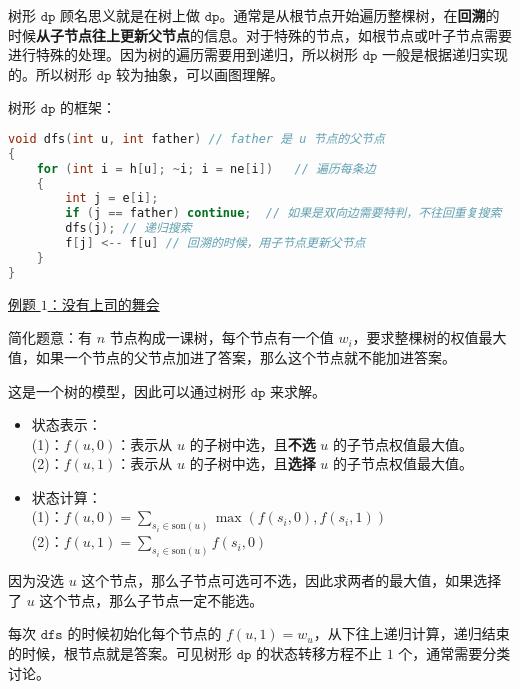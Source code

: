 


树形 $\texttt{dp}$ 顾名思义就是在树上做 $\texttt{dp}$。通常是从根节点开始遍历整棵树，在\textbf{回溯}的时候\textbf{从子节点往上更新父节点}的信息。对于特殊的节点，如根节点或叶子节点需要进行特殊的处理。因为树的遍历需要用到递归，所以树形 $\texttt{dp}$ 一般是根据递归实现的。所以树形 $\texttt{dp}$ 较为抽象，可以画图理解。

树形 $\texttt{dp}$ 的框架：

\begin{lstlisting}[language=cpp]
void dfs(int u, int father) // father 是 u 节点的父节点
{
    for (int i = h[u]; ~i; i = ne[i])   // 遍历每条边
    {
        int j = e[i];
        if (j == father) continue;  // 如果是双向边需要特判，不往回重复搜索
        dfs(j); // 递归搜索
        f[j] <-- f[u] // 回溯的时候，用子节点更新父节点
    }
}
\end{lstlisting}

\href{https://www.luogu.com.cn/problem/P1352}{例题 $1$：没有上司的舞会}

简化题意：有 $n$ 节点构成一课树，每个节点有一个值 $w_i$，要求整棵树的权值最大值，如果一个节点的父节点加进了答案，那么这个节点就不能加进答案。

这是一个树的模型，因此可以通过树形 $\texttt{dp}$ 来求解。

\begin{itemize}
\item 状态表示：\\
    (1)：$f(u, 0)$：表示从 $u$ 的子树中选，且\textbf{不选} $u$ 的子节点权值最大值。\\
    (2)：$f(u, 1)$：表示从 $u$ 的子树中选，且\textbf{选择} $u$ 的子节点权值最大值。

\end{itemize}

\begin{itemize}
\item 状态计算：\\
    (1)：$f(u, 0) = \sum_{s_i \in \text{son}(u)} \max(f(s_i, 0), f(s_i, 1))$ \\
    (2)：$f(u, 1) = \sum_{s_i \in \text{son}(u)} f(s_i, 0)$
\end{itemize}

因为没选 $u$ 这个节点，那么子节点可选可不选，因此求两者的最大值，如果选择了 $u$ 这个节点，那么子节点一定不能选。

每次 $\texttt{dfs}$ 的时候初始化每个节点的 $f(u, 1) = w_u$，从下往上递归计算，递归结束的时候，根节点就是答案。可见树形 $\texttt{dp}$ 的状态转移方程不止 $1$ 个，通常需要分类讨论。


